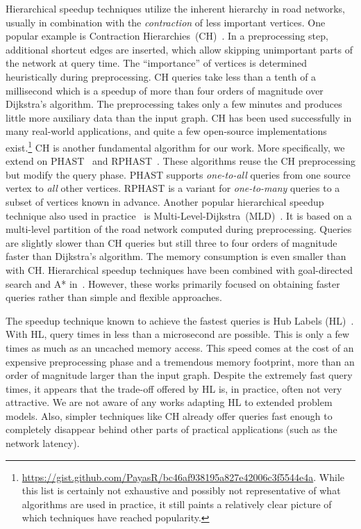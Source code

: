 \documentclass[manuscript]{acmart}
\begin{document}
Hierarchical speedup techniques utilize the inherent hierarchy in road networks, usually in combination with the \emph{contraction} of less important vertices.
One popular example is Contraction Hierarchies~(CH)~\cite{gssv-erlrn-12}.
In a preprocessing step, additional shortcut edges are inserted, which allow skipping unimportant parts of the network at query time.
The ``importance'' of vertices is determined heuristically during preprocessing.
CH queries take less than a tenth of a millisecond which is a speedup of more than four orders of magnitude over Dijkstra's algorithm.
The preprocessing takes only a few minutes and produces little more auxiliary data than the input graph.
CH has been used successfully in many real-world applications, and quite a few open-source implementations exist.\footnote{
\url{https://gist.github.com/PayasR/bc46af938195a827e42006c3f5544e4a}.
While this list is certainly not exhaustive and possibly not representative of what algorithms are used in practice, it still paints a relatively clear picture of which techniques have reached popularity.
}
CH is another fundamental algorithm for our work.
More specifically, we extend on PHAST~\cite{dgnw-phast-13} and RPHAST~\cite{delling_et_al:OASIcs:2011:3266}.
These algorithms reuse the CH preprocessing but modify the query phase.
PHAST supports \emph{one-to-all} queries from one source vertex to \emph{all} other vertices.
RPHAST is a variant for \emph{one-to-many} queries to a subset of vertices known in advance.
%
Another popular hierarchical speedup technique also used in practice~\cite{bingblog} is Multi-Level-Dijkstra~(MLD)~\cite{swz-umlgt-02}.
It is based on a multi-level partition of the road network computed during preprocessing.
Queries are slightly slower than CH queries but still three to four orders of magnitude faster than Dijkstra's algorithm.
The memory consumption is even smaller than with CH.
Hierarchical speedup techniques have been combined with goal-directed search and A* in~\cite{bdsssw-chgds-10,gkw-blwr-07,bdgwz-sfpcs-19}.
However, these works primarily focused on obtaining faster queries rather than simple and flexible approaches.

The speedup technique known to achieve the fastest queries is Hub Labels (HL)~\cite{DBLP:conf/esa/AbrahamDGW12,DBLP:conf/wea/DellingGW13}.
With HL, query times in less than a microsecond are possible.
This is only a few times as much as an uncached memory access.
This speed comes at the cost of an expensive preprocessing phase and a tremendous memory footprint, more than an order of magnitude larger than the input graph.
Despite the extremely fast query times, it appears that the trade-off offered by HL is, in practice, often not very attractive.
We are not aware of any works adapting HL to extended problem models.
Also, simpler techniques like CH already offer queries fast enough to completely disappear behind other parts of practical applications (such as the network latency).
\end{document}

